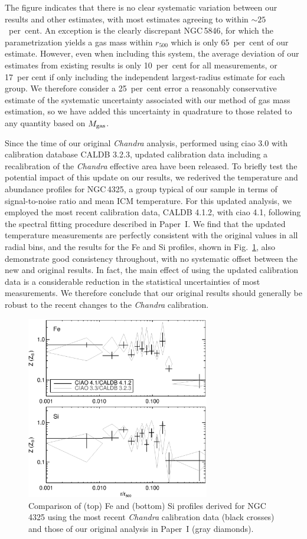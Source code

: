 \documentclass[useAMS,usenatbib]{mn2e}
\begin{document}
The figure indicates that there is no clear systematic variation
between our results and other estimates, with most estimates agreeing
to within $\sim 25$~per~cent. An exception is the clearly discrepant
NGC\,5846, for which the \citet{sand03} parametrization yields a gas
mass within $r_{500}$ which is only 65~per~cent of our
estimate. However, even when including this system, the average
deviation of our estimates from existing results is only 10~per~cent
for all measurements, or 17~per cent if only including the independent
largest-radius estimate for each group. We therefore consider a
25~per~cent error a reasonably conservative estimate of the systematic
uncertainty associated with our method of gas mass estimation, so we
have added this uncertainty in quadrature to those related to any
quantity based on $M_{\rm gas}$.

Since the time of our original {\em Chandra} analysis, performed using
{\sc ciao} 3.0 with calibration database CALDB 3.2.3, updated
calibration data including a recalibration of the {\em Chandra}
effective area have been released. To briefly test the potential
impact of this update on our results, we rederived the temperature and
abundance profiles for NGC\,4325, a group typical of our sample in
terms of signal-to-noise ratio and mean ICM temperature. For this
updated analysis, we employed the most recent calibration data, CALDB
4.1.2, with {\sc ciao} 4.1, following the spectral fitting procedure
described in Paper~I. We find that the updated temperature
measurements are perfectly consistent with the original values in all
radial bins, and the results for the Fe and Si profiles, shown in
Fig.~\ref{fig,N4325}, also demonstrate good consistency throughout,
with no systematic offset between the new and original results. In
fact, the main effect of using the updated calibration data is a
considerable reduction in the statistical uncertainties of most
measurements. We therefore conclude that our original results should
generally be robust to the recent changes to the {\em Chandra}
calibration.

\begin{figure} 
 \includegraphics[width=80mm]{fig4.eps}
 \caption{Comparison of (top) Fe and (bottom) Si profiles derived for
     NGC\,4325 using the most recent {\em Chandra} calibration data
     (black crosses) and those of our original analysis in Paper~I
     (gray diamonds).}
\label{fig,N4325}
\end{figure} 
\end{document}
